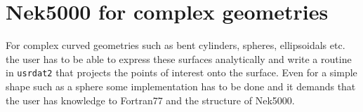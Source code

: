 


\section{Nek5000 for complex geometries}
For complex curved geometries such as bent cylinders, spheres, ellipsoidals etc.
the user has to be able to express these surfaces analytically and write a routine
in \verb|usrdat2| that projects the points of interest onto the surface.
Even for a simple shape such as a sphere some implementation has to be done and it 
demands that the user has knowledge to Fortran77 and the structure of Nek5000.

